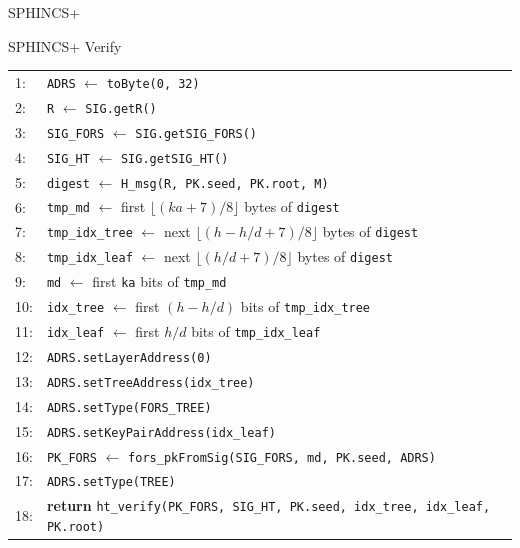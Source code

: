 \documentclass[version=preprint]{iacrcc}
\begin{document}
\begin{section}{SPHINCS+}
\begin{subsection}{SPHINCS+ Verify}
\begin{algorithm}
    \begin{tabular}{ll}
        1:  & \texttt{ADRS} $\leftarrow$ \texttt{toByte(0, 32)} \\
        2:  & \texttt{R} $\leftarrow$ \texttt{SIG.getR()} \\
        3:  & \texttt{SIG\_FORS} $\leftarrow$ \texttt{SIG.getSIG\_FORS()} \\
        4:  & \texttt{SIG\_HT} $\leftarrow$ \texttt{SIG.getSIG\_HT()} \\
        5:  & \texttt{digest} $\leftarrow$ \texttt{H\_msg(R, PK.seed, PK.root, M)} \\
        6:  & \texttt{tmp\_md} $\leftarrow$ first $\lfloor(\mathit{ka}+7)/8\rfloor$ bytes of \texttt{digest} \\
        7:  & \texttt{tmp\_idx\_tree} $\leftarrow$ next $\lfloor(h - h/d +7)/8\rfloor$ bytes of \texttt{digest} \\
        8:  & \texttt{tmp\_idx\_leaf} $\leftarrow$ next $\lfloor(h/d +7)/8\rfloor$ bytes of \texttt{digest} \\
        9:  & \texttt{md} $\leftarrow$ first \texttt{ka} bits of \texttt{tmp\_md} \\
        10: & \texttt{idx\_tree} $\leftarrow$ first $(h - h/d)$ bits of \texttt{tmp\_idx\_tree} \\
        11: & \texttt{idx\_leaf} $\leftarrow$ first $h/d$ bits of \texttt{tmp\_idx\_leaf} \\
        12: & \texttt{ADRS.setLayerAddress(0)} \\
        13: & \texttt{ADRS.setTreeAddress(idx\_tree)} \\
        14: & \texttt{ADRS.setType(FORS\_TREE)} \\
        15: & \texttt{ADRS.setKeyPairAddress(idx\_leaf)} \\
        16: & \texttt{PK\_FORS} $\leftarrow$ \texttt{fors\_pkFromSig(SIG\_FORS, md, PK.seed, ADRS)} \\
        17: & \texttt{ADRS.setType(TREE)} \\
        18: & \textbf{return} \texttt{ht\_verify(PK\_FORS, SIG\_HT, PK.seed, idx\_tree, idx\_leaf, PK.root)} \\
    \end{tabular}
\end{algorithm}


\end{subsection}
\end{section}
\end{document}
